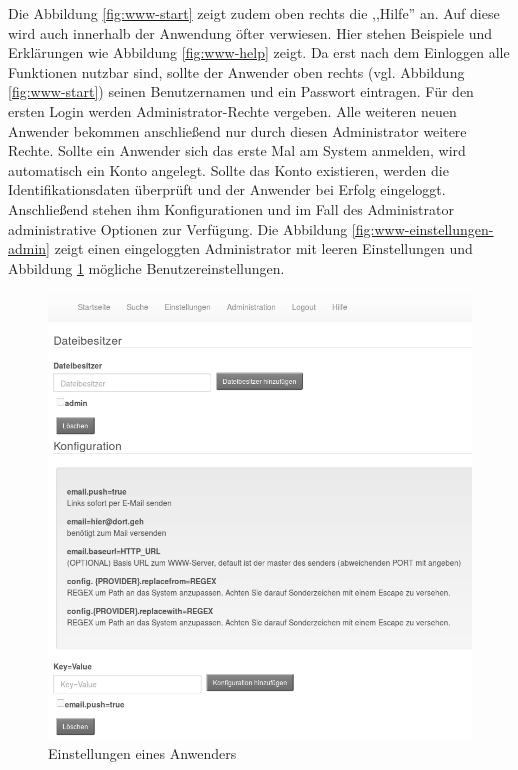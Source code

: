 \documentclass[oneside, ngerman, toc=bibliography,bibliography=totoc,listof=entryprefix, open=right,numbers=noenddot,fontsize=12pt]{scrbook}
\begin{document}
Die Abbildung  \ref{fig:www-start} zeigt zudem oben rechts die ,,Hilfe'' an. Auf diese wird auch innerhalb der Anwendung öfter verwiesen. Hier stehen Beispiele und Erklärungen wie Abbildung \ref{fig:www-help} zeigt. 
Da erst nach dem Einloggen alle Funktionen nutzbar sind, sollte der Anwender oben rechts (vgl. Abbildung \ref{fig:www-start}) seinen Benutzernamen und ein Passwort eintragen.
Für den ersten Login werden Administrator-Rechte vergeben. Alle weiteren neuen Anwender bekommen anschließend nur durch diesen Administrator weitere Rechte. Sollte ein Anwender sich das erste Mal am System anmelden, wird automatisch ein Konto angelegt. Sollte das Konto existieren, werden die Identifikationsdaten überprüft und der Anwender bei Erfolg eingeloggt.
Anschließend stehen ihm Konfigurationen und im Fall des Administrator administrative Optionen zur Verfügung.
Die Abbildung \ref{fig:www-einstellungen-admin} zeigt einen eingeloggten Administrator mit leeren Einstellungen und Abbildung \ref{fig:www-einstellungen-user} mögliche Benutzereinstellungen.



\begin{figure}[htbp] 
    \centering
    \includegraphics[width=\textwidth]{Masterarbeit_Bilder/www_einstellungen_user.png}
    \caption{Einstellungen eines Anwenders}
    \label{fig:www-einstellungen-user}
\end{figure}  
\end{document}
